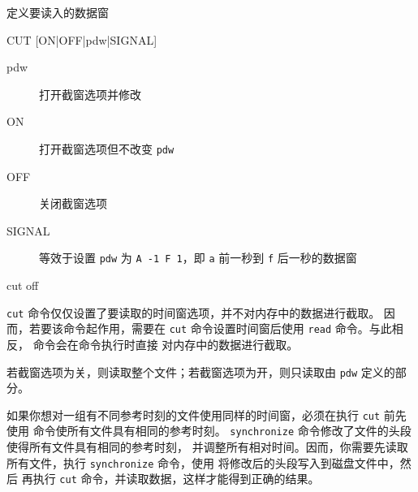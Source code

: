 \label{cmd:cut}

定义要读入的数据窗

\begin{SACSTX}
CUT [ON|OFF|pdw|SIGNAL]
\end{SACSTX}

\begin{description}
\item [pdw] 打开截窗选项并修改 
\item [ON] 打开截窗选项但不改变 \texttt{pdw}
\item [OFF] 关闭截窗选项
\item [SIGNAL] 等效于设置 \texttt{pdw} 为 \texttt{A -1 F 1}，即 \texttt{a}
    前一秒到 \texttt{f} 后一秒的数据窗
\end{description}

\begin{SACDFT}
cut off
\end{SACDFT}

\texttt{cut} 命令仅仅设置了要读取的时间窗选项，并不对内存中的数据进行截取。
因而，若要该命令起作用，需要在 \texttt{cut} 命令设置时间窗后使用
\texttt{read} 命令。与此相反， 命令会在命令执行时直接
对内存中的数据进行截取。

若截窗选项为关，则读取整个文件；若截窗选项为开，则只读取由 \texttt{pdw}
定义的部分。

如果你想对一组有不同参考时刻的文件使用同样的时间窗，必须在执行 \texttt{cut}
前先使用  命令使所有文件具有相同的参考时刻。
\texttt{synchronize} 命令修改了文件的头段使得所有文件具有相同的参考时刻，
并调整所有相对时间。因而，你需要先读取所有文件，执行 \texttt{synchronize}
命令，使用  将修改后的头段写入到磁盘文件中，然后
再执行 \texttt{cut} 命令，并读取数据，这样才能得到正确的结果。

